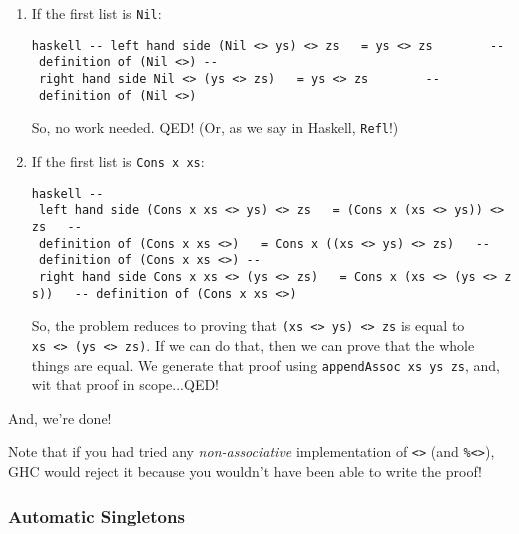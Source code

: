 \documentclass[]{article}
\begin{document}
\begin{enumerate}
\item
  If the first list is \texttt{Nil}:

  \texttt{haskell\ -\/-\ left\ hand\ side\ (Nil\ \textless{}\textgreater{}\ ys)\ \textless{}\textgreater{}\ zs\ \ \ =\ ys\ \textless{}\textgreater{}\ zs\ \ \ \ \ \ \ \ -\/-\ definition\ of\ \textasciigrave{}(Nil\ \textless{}\textgreater{})\textasciigrave{}\ -\/-\ right\ hand\ side\ Nil\ \textless{}\textgreater{}\ (ys\ \textless{}\textgreater{}\ zs)\ \ \ =\ ys\ \textless{}\textgreater{}\ zs\ \ \ \ \ \ \ \ -\/-\ definition\ of\ \textasciigrave{}(Nil\ \textless{}\textgreater{})\textasciigrave{}}

  So, no work needed. QED! (Or, as we say in Haskell, \texttt{Refl}!)
\item
  If the first list is \texttt{Cons\ x\ xs}:

  \texttt{haskell\ -\/-\ left\ hand\ side\ (Cons\ x\ xs\ \textless{}\textgreater{}\ ys)\ \textless{}\textgreater{}\ zs\ \ \ =\ (Cons\ x\ (xs\ \textless{}\textgreater{}\ ys))\ \textless{}\textgreater{}\ zs\ \ \ -\/-\ definition\ of\ \textasciigrave{}(Cons\ x\ xs\ \textless{}\textgreater{})\textasciigrave{}\ \ \ =\ Cons\ x\ ((xs\ \textless{}\textgreater{}\ ys)\ \textless{}\textgreater{}\ zs)\ \ \ -\/-\ definition\ of\ \textasciigrave{}(Cons\ x\ xs\ \textless{}\textgreater{})\textasciigrave{}\ -\/-\ right\ hand\ side\ Cons\ x\ xs\ \textless{}\textgreater{}\ (ys\ \textless{}\textgreater{}\ zs)\ \ \ =\ Cons\ x\ (xs\ \textless{}\textgreater{}\ (ys\ \textless{}\textgreater{}\ zs))\ \ \ -\/-\ definition\ of\ \textasciigrave{}(Cons\ x\ xs\ \textless{}\textgreater{})\textasciigrave{}}

  So, the problem reduces to proving that
  \texttt{(xs\ \textless{}\textgreater{}\ ys)\ \textless{}\textgreater{}\ zs} is
  equal to
  \texttt{xs\ \textless{}\textgreater{}\ (ys\ \textless{}\textgreater{}\ zs)}.
  If we can do that, then we can prove that the whole things are equal. We
  generate that proof using \texttt{appendAssoc\ xs\ ys\ zs}, and, wit that
  proof in scope...QED!
\end{enumerate}

And, we're done!

Note that if you had tried any \emph{non-associative} implementation of
\texttt{\textless{}\textgreater{}} (and \texttt{\%\textless{}\textgreater{}}),
GHC would reject it because you wouldn't have been able to write the proof!

\subsubsection{Automatic Singletons}
\end{document}
